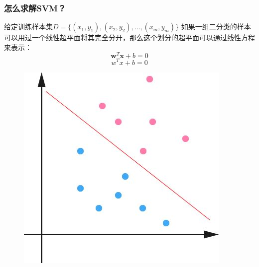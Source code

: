 \begin{frame}
\frametitle{怎么求解SVM？}
给定训练样本集$D = \{(x_1,y_1),(x_2,y_2),\dots,(x_m,y_m)\}$
 如果一组二分类的样本可以用过一个线性超平面将其完全分开，那么这个划分的超平面可以通过线性方程来表示：
 $$\boldsymbol{w}^T\boldsymbol{x}+b=0$$
 $$w^Tx +b = 0$$

           
	\begin{figure}[ht]
	\centering
	\includegraphics[width=0.5\linewidth]{partition/img/svm_10.jpg}  
	\end{figure}

\end{frame} 